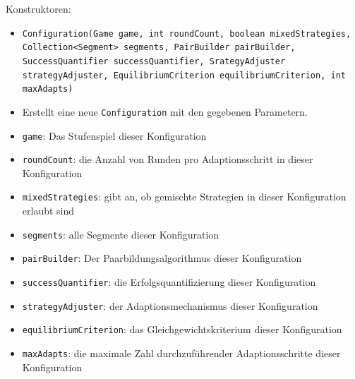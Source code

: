 \documentclass[parskip=full,11pt]{scrartcl}
\begin{document}
Konstruktoren:
\begin{itemize}\itemsep -10pt
\item \texttt{Configuration(Game game, int roundCount, boolean mixedStrategies, Collection<Segment> segments, PairBuilder pairBuilder, SuccessQuantifier successQuantifier, SrategyAdjuster strategyAdjuster, EquilibriumCriterion equilibriumCriterion, int maxAdapts)}
\item[] Erstellt eine neue \texttt{Configuration} mit den gegebenen Parametern.
\item[] \texttt{game}: Das Stufenspiel dieser Konfiguration
\item[] \texttt{roundCount}: die Anzahl von Runden pro Adaptionsschritt in dieser Konfiguration
\item[] \texttt{mixedStrategies}: gibt an, ob gemischte Strategien in dieser Konfiguration erlaubt sind
\item[] \texttt{segments}: alle Segmente dieser Konfiguration
\item[] \texttt{pairBuilder}: Der Paarbildungsalgorithmus dieser Konfiguration
\item[] \texttt{successQuantifier}: die Erfolgsquantifizierung dieser Konfiguration
\item[] \texttt{strategyAdjuster}: der Adaptionsmechanismus dieser Konfiguration
\item[] \texttt{equilibriumCriterion}: das Gleichgewichtskriterium dieser Konfiguration
\item[] \texttt{maxAdapts}: die maximale Zahl durchzuführender Adaptionsschritte dieser Konfiguration
\end{itemize}
\end{document}
